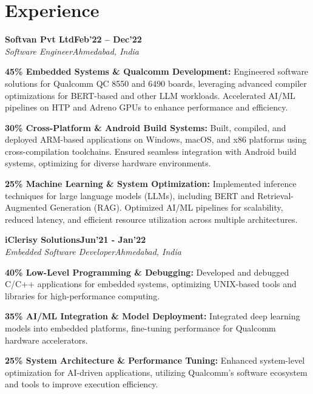 \documentclass[letterpaper,10pt]{article}
\newcommand{\heading}[2]{
  \hspace{10pt}#1\hfill#2\\
}
\newcommand{\headingBf}[2]{
  \heading{\textbf{#1}}{\textbf{#2}}
}
\newcommand{\headingIt}[2]{
  \heading{\textit{#1}}{\textit{#2}}
}
\newenvironment{resume_list}{
  \vspace{-7pt}
  \begin{itemize}[itemsep=-2px, parsep=1pt, leftmargin=30pt]
}{
  \end{itemize}
}
\begin{document}
\section{Experience}

  \headingBf{\faBriefcase Softvan Pvt Ltd}{Feb'22 -- Dec'22}
\headingIt{Software Engineer}{Ahmedabad, India}
\begin{resume_list}
  \item \textbf{45\% Embedded Systems \& Qualcomm Development:} 
  Engineered software solutions for Qualcomm QC 8550 and 6490 boards, leveraging advanced compiler optimizations for BERT-based and other LLM workloads. Accelerated AI/ML pipelines on HTP and Adreno GPUs to enhance performance and efficiency.

  \item \textbf{30\% Cross-Platform \& Android Build Systems:} 
  Built, compiled, and deployed ARM-based applications on Windows, macOS, and x86 platforms using cross-compilation toolchains. Ensured seamless integration with Android build systems, optimizing for diverse hardware environments.

  \item \textbf{25\% Machine Learning \& System Optimization:} 
  Implemented inference techniques for large language models (LLMs), including BERT and Retrieval-Augmented Generation (RAG). Optimized AI/ML pipelines for scalability, reduced latency, and efficient resource utilization across multiple architectures.
  \vspace{3pt}
\end{resume_list}


  \headingBf{\faBriefcase iClerisy Solutions}{Jun'21 - Jan'22}
  \headingIt{Embedded Software Developer}{Ahmedabad, India}
  \begin{resume_list}
    \item \textbf{40\% Low-Level Programming \& Debugging:} Developed and debugged C/C++ applications for embedded systems, optimizing UNIX-based tools and libraries for high-performance computing.
    \item \textbf{35\% AI/ML Integration \& Model Deployment:} Integrated deep learning models into embedded platforms, fine-tuning performance for Qualcomm hardware accelerators.
    \item \textbf{25\% System Architecture \& Performance Tuning:} Enhanced system-level optimization for AI-driven applications, utilizing Qualcomm’s software ecosystem and tools to improve execution efficiency.
  \end{resume_list}
\end{document}
